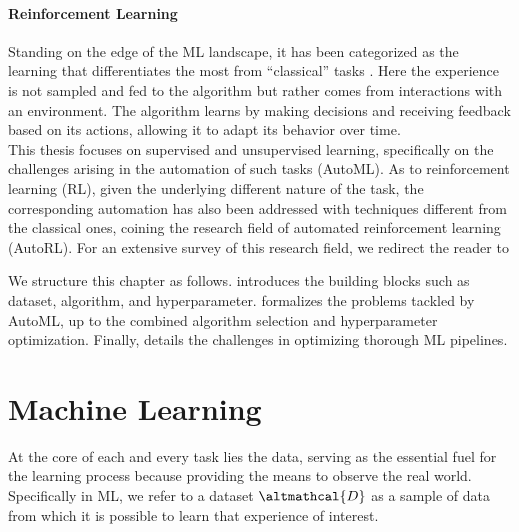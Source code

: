 \paragraph{Reinforcement Learning}
Standing on the edge of the ML landscape, it has been categorized as the learning that differentiates the most from ``classical'' tasks \cite{sutton2018reinforcement}.
Here the experience is not sampled and fed to the algorithm but rather comes from interactions with an environment.
The algorithm learns by making decisions and receiving feedback based on its actions, allowing it to adapt its behavior over time.\\

This thesis focuses on supervised and unsupervised learning, specifically on the challenges arising in the automation of such tasks (AutoML).
As to reinforcement learning (RL), given the underlying different nature of the task, the corresponding automation has also been addressed with techniques different from the classical ones, coining the research field of automated reinforcement learning (AutoRL).
For an extensive survey of this research field, we redirect the reader to \cite{mohan-automlconf23a}

We structure this chapter as follows.  introduces the building blocks such as dataset, algorithm, and hyperparameter.
 formalizes the problems tackled by AutoML, up to the combined algorithm selection and hyperparameter optimization.
Finally,  details the challenges in optimizing thorough ML pipelines.

\section{Machine Learning}\label{automl-background-sec:ml}

At the core of each and every task lies the data, serving as the essential fuel for the learning process because providing the means to observe the real world.
Specifically in ML, we refer to a dataset $\altmathcal{D}$ as a sample of data from which it is possible to learn that experience of interest.

